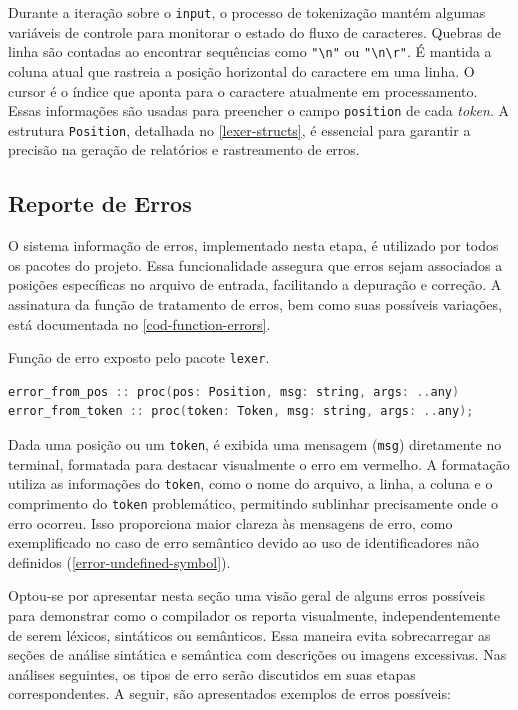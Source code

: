 Durante a iteração sobre o \texttt{input}, o processo de tokenização mantém algumas variáveis de controle para monitorar o estado do fluxo de caracteres. Quebras de linha são contadas ao encontrar sequências como \verb|"\n"| ou \verb|"\n\r"|. É mantida a coluna atual que rastreia a posição horizontal do caractere em uma linha. O cursor é o índice que aponta para o caractere atualmente em processamento. Essas informações são usadas para preencher o campo \texttt{position} de cada \textit{token}. A estrutura \texttt{Position}, detalhada no \autoref{lexer-structs}, é essencial para garantir a precisão na geração de relatórios e rastreamento de erros.

\subsection{Reporte de Erros} \label{subsection-erros}

O sistema informação de erros, implementado nesta etapa, é utilizado por todos os pacotes do projeto. Essa funcionalidade assegura que erros sejam associados a posições específicas no arquivo de entrada, facilitando a depuração e correção. A assinatura da função de tratamento de erros, bem como suas possíveis variações, está documentada no \autoref{cod-function-errors}.

\begin{codigo}[H]
    \caption{\small Função de erro exposto pelo pacote \texttt{lexer}. }
        \label{cod-function-errors}
\begin{lstlisting}[language=C++]
error_from_pos :: proc(pos: Position, msg: string, args: ..any)
error_from_token :: proc(token: Token, msg: string, args: ..any);
\end{lstlisting}
\end{codigo}


Dada uma posição ou um \texttt{token}, é exibida uma mensagem (\texttt{msg}) diretamente no terminal, formatada para destacar visualmente o erro em vermelho. A formatação utiliza as informações do \texttt{token}, como o nome do arquivo, a linha, a coluna e o comprimento do \texttt{token} problemático, permitindo sublinhar precisamente onde o erro ocorreu. Isso proporciona maior clareza às mensagens de erro, como exemplificado no caso de erro semântico devido ao uso de identificadores não definidos (\autoref{error-undefined-symbol}).

Optou-se por apresentar nesta seção uma visão geral de alguns erros possíveis para demonstrar como o compilador os reporta visualmente, independentemente de serem léxicos, sintáticos ou semânticos. Essa maneira evita sobrecarregar as seções de análise sintática e semântica com descrições ou imagens excessivas. Nas análises seguintes, os tipos de erro serão discutidos em suas etapas correspondentes. A seguir, são apresentados exemplos de erros possíveis:

